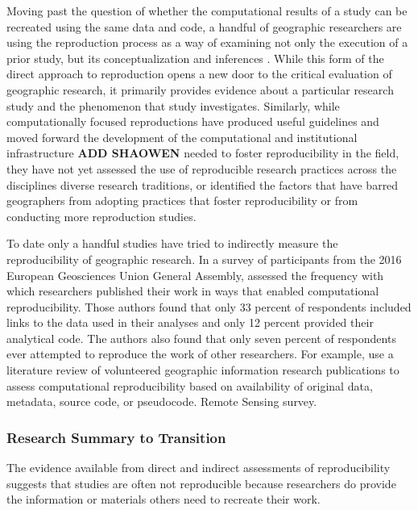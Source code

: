 \documentclass[]{interact}
\theoremstyle{plain}%
\theoremstyle{definition}
\theoremstyle{remark}
\begin{document}
Moving past the question of whether the computational results of a study can be recreated using the same data and code, a handful of geographic researchers are using the reproduction process as a way of examining not only the execution of a prior study, but its conceptualization and inferences \citep{Kedron_MollaloRP, Kedron_SaffaryRP, Kedron_VijayanRP}. 
While this form of the direct approach to reproduction opens a new door to the critical evaluation of geographic research, it primarily provides evidence about a particular research study and the phenomenon that study investigates. 
Similarly, while computationally focused reproductions have produced useful guidelines \citep{hofer2019reproducible, wilson2021} and moved forward the development of the computational and institutional infrastructure \citep{Kedron_Holler_Bardin_Hilgendorf_2022, nust2019, nust2021,}\textbf{ADD SHAOWEN} needed to foster reproducibility in the field, they have not yet assessed the use of reproducible research practices across the disciplines diverse research traditions, or identified the factors that have barred geographers from adopting practices that foster reproducibility or from conducting more reproduction studies. 


To date only a handful studies have tried to indirectly measure the reproducibility of geographic research.
In a survey of participants from the 2016 European Geosciences Union General Assembly, \citet{konkol2019} assessed the frequency with which researchers published their work in ways that enabled computational reproducibility. 
Those authors found that only 33 percent of respondents included links to the data used in their analyses and only 12 percent provided their analytical code. 
The authors also found that only seven percent of respondents ever attempted to reproduce the work of other researchers.
For example, \citet{ostermann2017} use a literature review of volunteered geographic information research publications to assess computational reproducibility based on availability of original data, metadata, source code, or pseudocode.
Remote Sensing survey.

\subsubsection*{Research Summary to Transition}
The evidence available from direct and indirect assessments of reproducibility suggests that studies are often not reproducible because researchers do provide the information or materials others need to recreate their work. 
\end{document}
